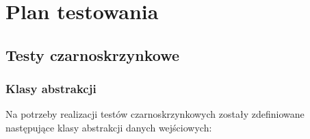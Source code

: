 \documentclass[10pt]{dokument-tiwo}
\begin{document}
\MakeDokumentMeta


\section{Plan testowania}
  \subsection{Testy czarnoskrzynkowe}
    \subsubsection{Klasy abstrakcji}
    Na potrzeby realizacji testów czarnoskrzynkowych zostały zdefiniowane\\następujące klasy abstrakcji danych wejściowych:
\end{document}
